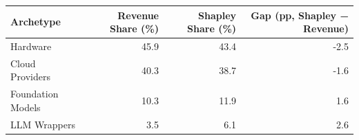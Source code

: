 

\begin{tabular}{@{}lrrr@{}}
\toprule
Archetype & Revenue Share (\%) & Shapley Share (\%) & Gap (pp, Shapley − Revenue) \\
\midrule
Hardware & 45.9 & 43.4 & -2.5 \\
Cloud Providers & 40.3 & 38.7 & -1.6 \\
Foundation Models & 10.3 & 11.9 & 1.6 \\
LLM Wrappers & 3.5 & 6.1 & 2.6 \\
\bottomrule
\end{tabular}